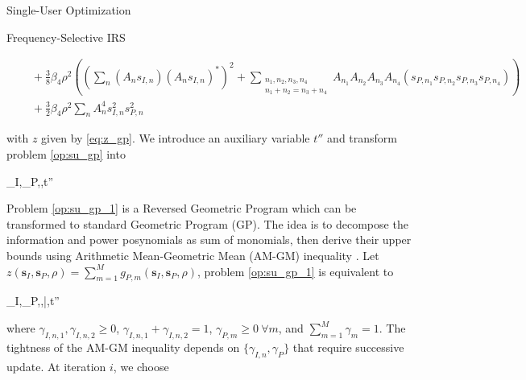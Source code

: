 \documentclass{IEEEtran}
\begin{document}
\begin{section}{Single-User Optimization}
\begin{subsection}{Frequency-Selective IRS}
\begin{figure*}[b]
\begin{equation}
\begin{split}
					&\quad+\frac{3}{8}{\beta_4}{\rho^2} \left(\left(\sum_{n}(A_n s_{I,n})(A_n s_{I,n})^*\right)^2 + \sum_{\substack{{n_1},{n_2},{n_3},{n_4}\\{n_1}+{n_2}={n_3}+{n_4}}}{A_{n_1}A_{n_2}A_{n_3}A_{n_4}(s_{P,n_1}s_{P,n_2}s_{P,n_3}s_{P,n_4})}\right)\\
					&\quad+\frac{3}{2}{\beta_4}{\rho^2}\sum_n{{A_n^4}{s_{I,n}^2}{s_{P,n}^2}}
				\end{split}
			\end{equation}
		\end{figure*}
		with $z$ given by \ref{eq:z_gp}. We introduce an auxiliary variable $t''$ and transform problem \ref{op:su_gp} into
		\begin{mini!}
				{\boldsymbol{s}_I,_P,\rho,t''}{}{\label{op:su_gp_1}}{}
			\end{mini!}
		Problem \ref{op:su_gp_1} is a Reversed Geometric Program which can be transformed to standard Geometric Program (GP). The idea is to decompose the information and power posynomials as sum of monomials, then derive their upper bounds using Arithmetic Mean-Geometric Mean (AM-GM) inequality \cite{Clerckx2018b,Chiang2005}. Let $z(\boldsymbol{s}_I,\boldsymbol{s}_P,\rho)=\sum_{m=1}^{M}{g_{P,m}(\boldsymbol{s}_I,\boldsymbol{s}_P,\rho)}$, problem \ref{op:su_gp_1} is equivalent to
		\begin{mini}
			{\boldsymbol{s}_I,_P,\rho,\bar{\rho},t''}{}{\label{op:su_gp_2}}{}
		\end{mini}
		where $\gamma_{I,n,1},\gamma_{I,n,2} \ge 0$, $\gamma_{I,n,1}+\gamma_{I,n,2}=1$, $\gamma_{P,m} \ge 0 \ \forall m$, and $\sum_{m=1}^{M}{\gamma_m}=1$. The tightness of the AM-GM inequality depends on $\{\gamma_{I,n},\gamma_P\}$ that require successive update. At iteration $i$, we choose \cite{Clerckx2018b}

\end{subsection}
\end{section}
\end{document}
